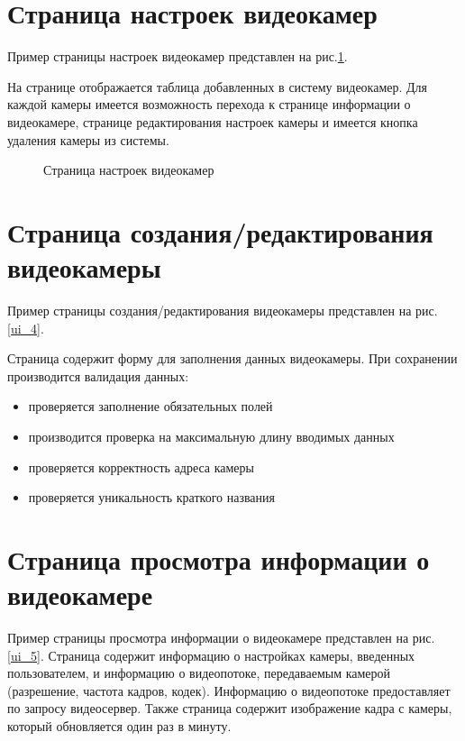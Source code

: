 \section{Страница настроек видеокамер}
Пример страницы настроек видеокамер представлен на рис.\ref{ui_6}.

На странице отображается таблица добавленных в систему видеокамер.
Для каждой камеры имеется возможность перехода к странице информации о видеокамере,
странице редактирования настроек камеры и имеется кнопка удаления камеры из системы.

\begin{figure}[!htb]
\def\svgwidth{\columnwidth}
\caption{Страница настроек видеокамер}
\label{ui_6}
\end{figure}

\section{Страница создания/редактирования видеокамеры}
Пример страницы создания/редактирования видеокамеры представлен на рис.\ref{ui_4}.

Страница содержит форму для заполнения данных видеокамеры.
При сохранении производится валидация данных:
\smallskip
\begin{itemize}
\item проверяется заполнение обязательных полей
\item производится проверка на максимальную длину вводимых данных
\item проверяется корректность адреса камеры
\item проверяется уникальность краткого названия
\end{itemize}

\section{Страница просмотра информации о видеокамере}
Пример страницы просмотра информации о видеокамере представлен на рис.\ref{ui_5}.
Страница содержит информацию о настройках камеры, введенных пользователем, и информацию
о видеопотоке, передаваемым камерой (разрешение, частота кадров, кодек).
Информацию о видеопотоке предоставляет по запросу видеосервер.
Также страница содержит изображение кадра с камеры, который обновляется один раз в минуту.

